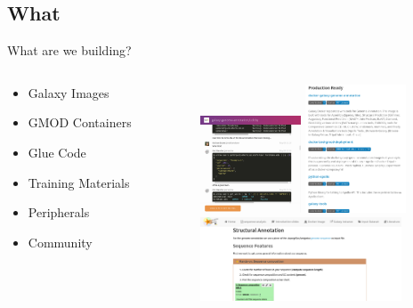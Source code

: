 \documentclass[12pt]{phage3slides} %
\begin{document}
\subsection{What}
\begin{frame}{What are we building?}
    \begin{columns}
        \begin{column}{0.38\textwidth}
            \begin{itemize}
                \item Galaxy Images
                \item GMOD Containers
                \item Glue Code
                \item Training Materials
                \item Peripherals
                \item Community
            \end{itemize}
        \end{column}
        \begin{column}{0.58\textwidth}
            \includegraphics[width=3cm]{img/gga-chat.png}
            \includegraphics[width=3cm]{img/gga-gh.png} \\[.7cm]
            \includegraphics[width=6cm]{img/gga-docs.png}
        \end{column}
    \end{columns}
\end{frame}
\end{document}
